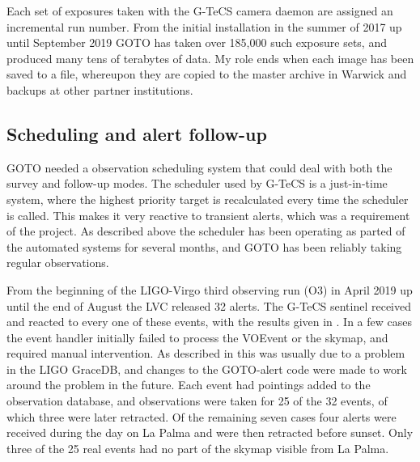 \begin{colsection}
\begin{colsection}
Each set of exposures taken with the G-TeCS camera daemon are assigned an incremental run number. From the initial installation in the summer of 2017 up until September 2019 GOTO has taken over 185,000 such exposure sets, and produced many tens of terabytes of data. My role ends when each image has been saved to a file, whereupon they are copied to the master archive in Warwick and backups at other partner institutions.

\end{colsection}

\newpage
\subsection{Scheduling and alert follow-up}
\label{sec:gw_results}
\begin{colsection}

GOTO needed a observation scheduling system that could deal with both the survey and follow-up modes. The scheduler used by G-TeCS is a just-in-time system, where the highest priority target is recalculated every time the scheduler is called. This makes it very reactive to transient alerts, which was a requirement of the project. As described above the scheduler has been operating as parted of the automated systems for several months, and GOTO has been reliably taking regular observations.

From the beginning of the LIGO-Virgo third observing run (O3) in April 2019 up until the end of August the LVC released 32 alerts. The G-TeCS sentinel received and reacted to every one of these events, with the results given in . In a few cases the event handler initially failed to process the VOEvent or the skymap, and required manual intervention. As described in
this was usually due to a problem in the LIGO GraceDB, and changes to the GOTO-alert code were made to work around the problem in the future. Each event had pointings added to the observation database, and observations were taken for 25 of the 32 events, of which three were later retracted. Of the remaining seven cases four alerts were received during the day on La Palma and were then retracted before sunset. Only three of the 25 real events had no part of the skymap visible from La Palma.


\end{colsection}
\end{colsection}

